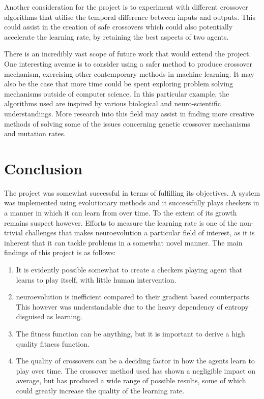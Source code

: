 \documentclass[12pt,a4paper]{article}
\begin{document}
        Another consideration for the project is to experiment with different crossover algorithms that utilise the temporal difference between inputs and outputs. This could assist in the creation of safe crossovers which could also potentially accelerate the learning rate, by retaining the best aspects of two agents.
        
        There is an incredibly vast scope of future work that would extend the project. One interesting avenue is to consider using a safer method to produce crossover mechanism, exercising other contemporary methods in machine learning. It may also be the case that more time could be spent exploring problem solving mechanisms  outside of computer science. In this particular example, the algorithms used are inspired by various biological and neuro-scientific understandings. More research into this field may assist in finding more creative methods of solving some of the issues concerning genetic crossover mechanisms and mutation rates.
    


\section{Conclusion}

    The project was somewhat successful in terms of fulfilling its objectives. A system was implemented using evolutionary methods and it successfully plays checkers in a manner in which it can learn from over time. To the extent of its growth remains suspect however. Efforts to measure the learning rate is one of the non-trivial challenges that makes neuroevolution a particular field of interest, as it is inherent that it can tackle problems in a somewhat novel manner. The main findings of this project is as follows:
    \begin{enumerate}
    \item It is evidently possible somewhat to create a checkers playing agent that learns to play itself, with little human intervention.
    \item  neuroevolution is inefficient compared to their gradient based counterparts. This however was understandable due to the heavy dependency of entropy disguised as learning.
    \item  The fitness function can be anything, but it is important to derive a high quality fitness function.
    \item The quality of crossovers can be a deciding factor in how the agents learn to play over time. The crossover method used has shown a negligible impact on average, but has produced a wide range of possible results, some of which could greatly increase the quality of the learning rate.
    \end{enumerate}
\end{document}
